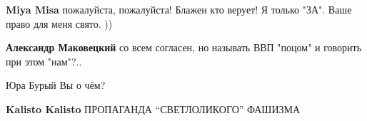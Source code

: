 \begin{itemize}
\begin{itemize}
 
\textbf{Miya Misa} пожалуйста, пожалуйста! Блажен кто верует! Я только "ЗА". Ваше право для меня свято. ))

 
\textbf{Александр Маковецкий} со всем согласен, но называть ВВП "поцом" и говорить при этом "нам"?..

 
Юра Бурый Вы о чём?

 
\textbf{Kalisto Kalisto} ПРОПАГАНДА \enquote{СВЕТЛОЛИКОГО} ФАШИЗМА

\end{itemize}

\end{itemize}

